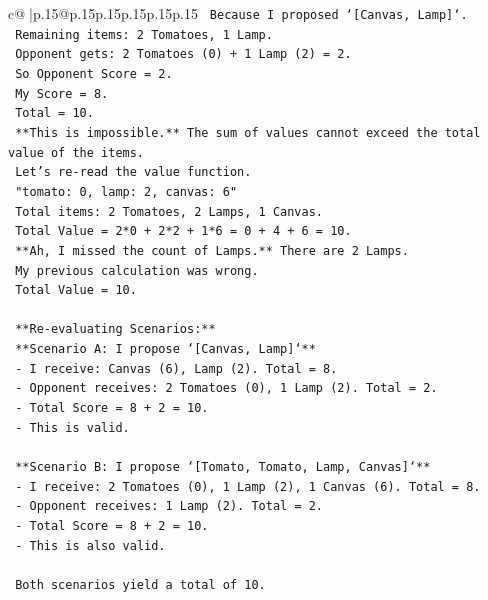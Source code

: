 \documentclass{article}
\begin{document}
{\begin{supertabular}{c@{$\;$}|p{.15\linewidth}@{}p{.15\linewidth}p{.15\linewidth}p{.15\linewidth}p{.15\linewidth}p{.15\linewidth}}
{{{\texttt{    Because I proposed `{[}Canvas, Lamp{]}`.} \\
\texttt{    Remaining items: 2 Tomatoes, 1 Lamp.} \\
\texttt{    Opponent gets: 2 Tomatoes (0) + 1 Lamp (2) = 2.} \\
\texttt{    So Opponent Score = 2.} \\
\texttt{    My Score = 8.} \\
\texttt{    Total = 10.} \\
\texttt{    **This is impossible.** The sum of values cannot exceed the total value of the items.} \\
\texttt{    Let's re{-}read the value function.} \\
\texttt{    "tomato: 0, lamp: 2, canvas: 6"} \\
\texttt{    Total items: 2 Tomatoes, 2 Lamps, 1 Canvas.} \\
\texttt{    Total Value = 2*0 + 2*2 + 1*6 = 0 + 4 + 6 = 10.} \\
\texttt{    **Ah, I missed the count of Lamps.** There are 2 Lamps.} \\
\texttt{    My previous calculation was wrong.} \\
\texttt{    Total Value = 10.} \\
\\ 
\texttt{    **Re{-}evaluating Scenarios:**} \\
\texttt{    **Scenario A: I propose `{[}Canvas, Lamp{]}`**} \\
\texttt{    {-} I receive: Canvas (6), Lamp (2). Total = 8.} \\
\texttt{    {-} Opponent receives: 2 Tomatoes (0), 1 Lamp (2). Total = 2.} \\
\texttt{    {-} Total Score = 8 + 2 = 10.} \\
\texttt{    {-} This is valid.} \\
\\ 
\texttt{    **Scenario B: I propose `{[}Tomato, Tomato, Lamp, Canvas{]}`**} \\
\texttt{    {-} I receive: 2 Tomatoes (0), 1 Lamp (2), 1 Canvas (6). Total = 8.} \\
\texttt{    {-} Opponent receives: 1 Lamp (2). Total = 2.} \\
\texttt{    {-} Total Score = 8 + 2 = 10.} \\
\texttt{    {-} This is also valid.} \\
\\ 
\texttt{    Both scenarios yield a total of 10.} \\
}}}
\end{supertabular}}
\end{document}
